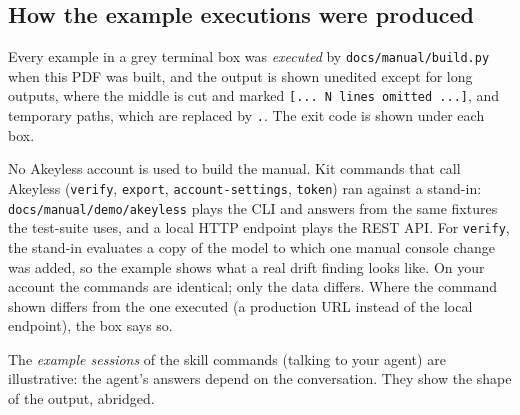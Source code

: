 \subsection{How the example executions were produced}\label{sec:how-examples}
Every example in a grey terminal box was \emph{executed} by \texttt{docs/manual/build.py} when this
PDF was built, and the output is shown unedited except for long outputs, where the middle is cut
and marked \texttt{[... N lines omitted ...]}, and temporary paths, which are replaced by \texttt{.}.
The exit code is shown under each box.

\begin{note}
No Akeyless account is used to build the manual. Kit commands that call Akeyless
(\texttt{verify}, \texttt{export}, \texttt{account-settings}, \texttt{token}) ran against a
stand-in: \texttt{docs/manual/demo/akeyless} plays the CLI and answers from the same fixtures the
test-suite uses, and a local HTTP endpoint plays the REST API. For \texttt{verify}, the stand-in
evaluates a copy of the model to which one manual console change was added, so the example shows
what a real drift finding looks like. On your account the commands are identical; only the data differs.
Where the command shown differs from the one executed (a production URL instead of the local
endpoint), the box says so.
\end{note}

The \emph{example sessions} of the skill commands (talking to your agent) are illustrative: the agent's
answers depend on the conversation. They show the shape of the output, abridged.
